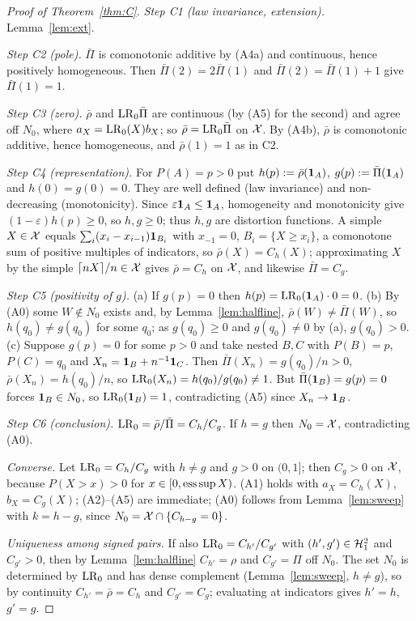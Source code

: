 \begin{proof}[Proof of Theorem~\ref{thm:C}]
\emph{Step C1 (law invariance, extension).} Lemma~\ref{lem:ext}.

\emph{Step C2 (pole).} $\bar\Pi$ is comonotonic additive by (A4a) and continuous, hence positively homogeneous. Then
$\bar\Pi(2)=2\bar\Pi(1)$ and $\bar\Pi(2)=\bar\Pi(1)+1$ give $\bar\Pi(1)=1$.

\emph{Step C3 (zero).} $\bar\rho$ and $\mathrm{LR}_0\bar\Pi$ are continuous (by (A5) for the second) and agree off $N_0$,
where $a_X=\mathrm{LR}_0(X)b_X$; so $\bar\rho=\mathrm{LR}_0\bar\Pi$ on $\mathcal X$. By (A4b), $\bar\rho$ is comonotonic additive, hence
homogeneous, and $\bar\rho(1)=1$ as in C2.

\emph{Step C4 (representation).} For $P(A)=p>0$ put $h(p):=\bar\rho(\mathbf 1_A)$, $g(p):=\bar\Pi(\mathbf 1_A)$ and
$h(0)=g(0)=0$. They are well defined (law invariance) and non-decreasing (monotonicity). Since
$\varepsilon\mathbf 1_A\le\mathbf 1_A$, homogeneity and monotonicity give $(1-\varepsilon)h(p)\ge0$, so $h,g\ge0$; thus $h,g$ are
distortion functions. A simple $X\in\mathcal X$ equals $\sum_i(x_i-x_{i-1})\mathbf 1_{B_i}$ with $x_{-1}=0$, $B_i=\{X\ge x_i\}$,
a comonotone sum of positive multiples of indicators, so $\bar\rho(X)=C_h(X)$; approximating $X$ by the simple
$\lceil nX\rceil/n\in\mathcal X$ gives $\bar\rho=C_h$ on $\mathcal X$, and likewise $\bar\Pi=C_g$.

\emph{Step C5 (positivity of $g$).} (a) If $g(p)=0$ then $h(p)=\mathrm{LR}_0(\mathbf 1_A)\cdot0=0$. (b) By (A0) some $W\notin N_0$
exists and, by Lemma~\ref{lem:halfline}, $\bar\rho(W)\ne\bar\Pi(W)$, so $h(q_0)\ne g(q_0)$ for some $q_0$; as
$g(q_0)\ge0$ and $g(q_0)\ne0$ by (a), $g(q_0)>0$. (c) Suppose $g(p)=0$ for some $p>0$ and take nested $B,C$ with
$P(B)=p$, $P(C)=q_0$ and $X_n=\mathbf 1_B+n^{-1}\mathbf 1_C$. Then $\bar\Pi(X_n)=g(q_0)/n>0$, $\bar\rho(X_n)=h(q_0)/n$, so
$\mathrm{LR}_0(X_n)=h(q_0)/g(q_0)\ne1$. But $\bar\Pi(\mathbf 1_B)=g(p)=0$ forces $\mathbf 1_B\in N_0$, so $\mathrm{LR}_0(\mathbf 1_B)=1$, contradicting (A5)
since $X_n\to\mathbf 1_B$.

\emph{Step C6 (conclusion).} $\mathrm{LR}_0=\bar\rho/\bar\Pi=C_h/C_g$. If $h=g$ then $N_0=\mathcal X$, contradicting (A0).

\emph{Converse.} Let $\mathrm{LR}_0=C_h/C_g$ with $h\ne g$ and $g>0$ on $(0,1]$; then $C_g>0$ on $\mathcal X$, because
$P(X>x)>0$ for $x\in[0,\operatorname{ess\,sup} X)$. (A1) holds with $a_X=C_h(X)$, $b_X=C_g(X)$;
(A2)--(A5) are immediate; (A0) follows from Lemma~\ref{lem:sweep} with $k=h-g$, since
$N_0=\mathcal X\cap\{C_{h-g}=0\}$.

\emph{Uniqueness among signed pairs.} If also $\mathrm{LR}_0=C_{h'}/C_{g'}$ with $(h',g')\in\mathcal H_1^2$ and $C_{g'}>0$, then by
Lemma~\ref{lem:halfline} $C_{h'}=\rho$ and $C_{g'}=\Pi$ off $N_0$. The set $N_0$ is determined by $\mathrm{LR}_0$ and has dense
complement (Lemma~\ref{lem:sweep}, $h\ne g$), so by continuity $C_{h'}=\bar\rho=C_h$ and $C_{g'}=C_g$; evaluating at
indicators gives $h'=h$, $g'=g$. \qedhere
\end{proof}

